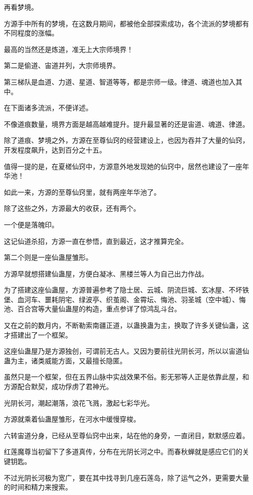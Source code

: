 \begin{this_body}
再看梦境。

方源手中所有的梦境，在这数月期间，都被他全部探索成功，各个流派的梦境都有不同程度的涨幅。

最高的当然还是炼道，准无上大宗师境界！

第二是偷道、宙道并列，大宗师境界。

第三梯队是血道、力道、星道、智道等等，都是宗师一级。律道、魂道也加入其中。

在下面诸多流派，不便详述。

不像道痕数量，境界方面是越高越难提升。提升最显著的还是宙道、魂道、律道。

除了道痕、梦境之外，方源在至尊仙窍的经营建设上，也因为吞并了大量的仙窍，开发程度飙升，达到百分之十五。

值得一提的是，在夏槎仙窍中，方源意外地发现她的仙窍中，居然也建设了一座年华池！

如此一来，方源的至尊仙窍里，就有两座年华池了。

除了这些之外，方源最大的收获，还有两个。

一个便是落魄印。

这记仙道杀招，方源一直在参悟，直到最近，这才推算完全。

第二个则是一座仙蛊屋雏形。

方源早就想搭建仙蛊屋，方便白凝冰、黑楼兰等人为自己出力作战。

为了搭建这座仙蛊屋，方源普遍参考了隐士居、云城、阴流巨城、玄冰屋、不坏铁堡、血河车、噩耗阴宅、绿波亭、织茧阁、金霄坛、悔池、羽圣城（空中城）、悔池、百合宫等大量仙蛊屋的构造，重点参详了惊鸿乱斗台。

又在之前的数月内，不断勒索南疆正道，以蛊换蛊为主，换取了许多关键仙蛊，这才搭建出了一个框架。

这座仙蛊屋乃是方源独创，可谓前无古人。又因为要前往光阴长河，所以以宙道仙蛊为主，诸类威能方面，又最擅长隐匿。

虽然只是一个框架，但在五界山脉中实战效果不俗。影无邪等人正是依靠此屋，和方源配合默契，成功俘虏了君神光。

光阴长河，潮起潮落，浪花飞溅，激起七彩华光。

方源就乘着仙蛊屋雏形，在河水中缓慢穿梭。

六转宙道分身，已经从至尊仙窍中出来，站在他的身旁，一直闭目，默默感应着。

红莲魔尊当初留下了多道真传，分布在光阴长河之中。而春秋蝉就是感应它们的关键钥匙。

不过光阴长河极为宽广，要在其中找寻到几座石莲岛，除了运气之外，更需要大量的时间和精力来搜索。


\end{this_body}
